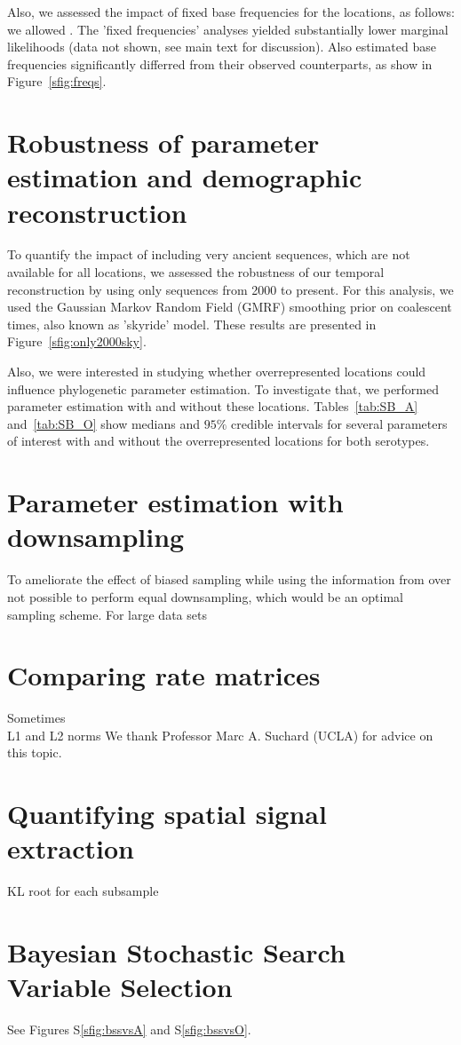 \documentclass[a4paper,10pt]{article}
\begin{document}
Also, we assessed the impact of fixed base frequencies for the locations, as follows: we allowed .
The 'fixed frequencies' analyses yielded substantially lower marginal likelihoods (data not shown, see main text for discussion).
Also estimated base frequencies significantly differred from their observed counterparts, as show in Figure~\ref{sfig:freqs}.
\section{Robustness of parameter estimation and demographic reconstruction}
To quantify the impact of including very ancient sequences, which are not available for all locations, we assessed the robustness of our temporal reconstruction by using only sequences from 2000 to present.
For this analysis, we used the Gaussian Markov Random Field (GMRF) smoothing prior on coalescent times, also known as 'skyride' model.
These results are presented in Figure~\ref{sfig:only2000sky}.

Also, we were interested in studying whether overrepresented locations could influence phylogenetic parameter estimation.
To investigate that, we performed parameter estimation with and without these locations.
Tables~\ref{tab:SB_A} and~\ref{tab:SB_O} show medians and $95 \%$ credible intervals for several parameters of interest with and without the overrepresented locations
for both serotypes.
\section{Parameter estimation with downsampling}
To ameliorate the effect of biased sampling while using the information from over 
not possible to perform equal downsampling, which would be an optimal sampling scheme. For large data sets \cite{fluPNAS}
\section{Comparing rate matrices}
Sometimes \\
L1 and L2 norms
We thank Professor Marc A. Suchard (UCLA) for advice on this topic.\\
\section{Quantifying spatial signal extraction}
KL root for each subsample \cite{KL}
\section{Bayesian Stochastic Search Variable Selection}
See Figures S\ref{sfig:bssvsA} and S\ref{sfig:bssvsO}. 
\end{document}
